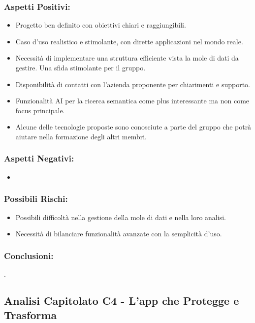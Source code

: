 \documentclass[a4paper,12pt]{article}
\begin{document}
\subsubsection*{Aspetti Positivi:}
\begin{itemize}
    \item Progetto ben definito con obiettivi chiari e raggiungibili.
    \item Caso d'uso realistico e stimolante, con dirette applicazioni nel mondo reale.
    \item Necessità di implementare una struttura efficiente vista la mole di dati da gestire. Una sfida stimolante per il gruppo.
    \item Disponibilità di contatti con l'azienda proponente per chiarimenti e supporto.
    \item Funzionalità AI per la ricerca semantica come plus interessante ma non come focus principale.
    \item Alcune delle tecnologie proposte sono conosciute a parte del gruppo che potrà aiutare nella formazione degli altri membri.
\end{itemize}

\subsubsection*{Aspetti Negativi:}
\begin{itemize}
    \item 
\end{itemize}

\subsubsection*{Possibili Rischi:}
\begin{itemize}
    \item Possibili difficoltà nella gestione della mole di dati e nella loro analisi.
    \item Necessità di bilanciare funzionalità avanzate con la semplicità d'uso.
\end{itemize}

\subsubsection*{Conclusioni:}
. 



\subsection{Analisi Capitolato C4 - L’app che Protegge e Trasforma}
\end{document}
